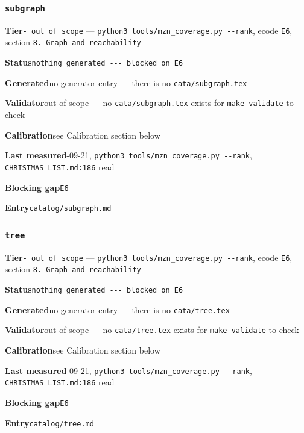\documentclass[10pt,a4paper]{article}
\newcommand{\entryfield}[2]{{\raggedright\textbf{#1}\quad #2\par}}
\begin{document}
\subsubsection*{\texttt{subgraph}}
\label{entry:subgraph}
\entryfield{Tier}{\texttt{- out of scope} --- \texttt{python3 tools/\allowbreak{}mzn\_\allowbreak{}coverage.\allowbreak{}py -\allowbreak{}-\allowbreak{}rank}, ecode \texttt{E6}, section \texttt{8.\allowbreak{} Graph and reachability}}
\entryfield{Status}{\texttt{nothing generated -\allowbreak{}-\allowbreak{}-\allowbreak{} blocked on E6}}
\entryfield{Generated}{no generator entry --- there is no \texttt{cata/subgraph.tex}}
\entryfield{Validator}{out of scope --- no \texttt{cata/subgraph.tex} exists for \texttt{make validate} to check}
\entryfield{Calibration}{see Calibration section below}
\entryfield{Last measured}{2026-09-21, \texttt{python3 tools/\allowbreak{}mzn\_\allowbreak{}coverage.\allowbreak{}py -\allowbreak{}-\allowbreak{}rank}, \texttt{CHRISTMAS\_LIST.md:186} read}
\entryfield{Blocking gap}{\texttt{E6}}
\entryfield{Entry}{\texttt{catalog/subgraph.md}}
\subsubsection*{\texttt{tree}}
\label{entry:tree}
\entryfield{Tier}{\texttt{- out of scope} --- \texttt{python3 tools/\allowbreak{}mzn\_\allowbreak{}coverage.\allowbreak{}py -\allowbreak{}-\allowbreak{}rank}, ecode \texttt{E6}, section \texttt{8.\allowbreak{} Graph and reachability}}
\entryfield{Status}{\texttt{nothing generated -\allowbreak{}-\allowbreak{}-\allowbreak{} blocked on E6}}
\entryfield{Generated}{no generator entry --- there is no \texttt{cata/tree.tex}}
\entryfield{Validator}{out of scope --- no \texttt{cata/tree.tex} exists for \texttt{make validate} to check}
\entryfield{Calibration}{see Calibration section below}
\entryfield{Last measured}{2026-09-21, \texttt{python3 tools/\allowbreak{}mzn\_\allowbreak{}coverage.\allowbreak{}py -\allowbreak{}-\allowbreak{}rank}, \texttt{CHRISTMAS\_LIST.md:186} read}
\entryfield{Blocking gap}{\texttt{E6}}
\entryfield{Entry}{\texttt{catalog/tree.md}}
\end{document}
